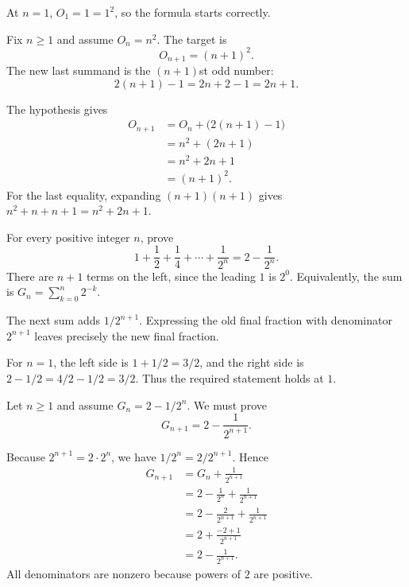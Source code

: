 At $n=1$, $O_1=1=1^2$, so the formula starts correctly.

Fix $n\geq1$ and assume $O_n=n^2$. The target is
\[
 O_{n+1}=(n+1)^2.
\]
The new last summand is the $(n+1)$st odd number:
\[
 2(n+1)-1=2n+2-1=2n+1.
\]

The hypothesis gives
\begin{align*}
 O_{n+1}
 &=O_n+\bigl(2(n+1)-1\bigr)\\
 &=n^2+(2n+1)\\
 &=n^2+2n+1\\
 &=(n+1)^2.
\end{align*}
For the last equality, expanding $(n+1)(n+1)$ gives
$n^2+n+n+1=n^2+2n+1$.



\goal For every positive integer $n$, prove
\[
 1+\frac12+\frac14+\cdots+\frac1{2^n}
 =2-\frac1{2^n}.
\]
There are $n+1$ terms on the left, since the leading $1$ is $2^0$.
Equivalently, the sum is $G_n=\sum_{k=0}^{n}2^{-k}$.

\idea The next sum adds $1/2^{n+1}$. Expressing the old final
fraction with denominator $2^{n+1}$ leaves precisely the new final fraction.

For $n=1$, the left side is $1+1/2=3/2$, and the right side is
$2-1/2=4/2-1/2=3/2$. Thus the required statement holds at $1$.

Let $n\geq1$ and assume $G_n=2-1/2^n$. We must prove
\[
 G_{n+1}=2-\frac1{2^{n+1}}.
\]

Because $2^{n+1}=2\cdot2^n$, we have
$1/2^n=2/2^{n+1}$. Hence
\begin{align*}
 G_{n+1}
 &=G_n+\frac1{2^{n+1}}\\
 &=2-\frac1{2^n}+\frac1{2^{n+1}}\\
 &=2-\frac2{2^{n+1}}+\frac1{2^{n+1}}\\
 &=2+\frac{-2+1}{2^{n+1}}\\
 &=2-\frac1{2^{n+1}}.
\end{align*}
All denominators are nonzero because powers of $2$ are positive.


